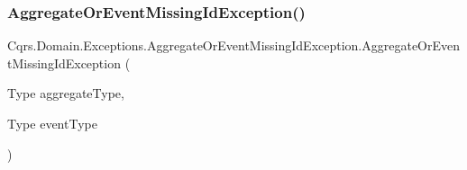 \subsubsection{\texorpdfstring{Aggregate\+Or\+Event\+Missing\+Id\+Exception()}{AggregateOrEventMissingIdException()}}
{\footnotesize\ttfamily Cqrs.\+Domain.\+Exceptions.\+Aggregate\+Or\+Event\+Missing\+Id\+Exception.\+Aggregate\+Or\+Event\+Missing\+Id\+Exception (\begin{DoxyParamCaption}\item[{Type}]{aggregate\+Type,  }\item[{Type}]{event\+Type }\end{DoxyParamCaption})}

